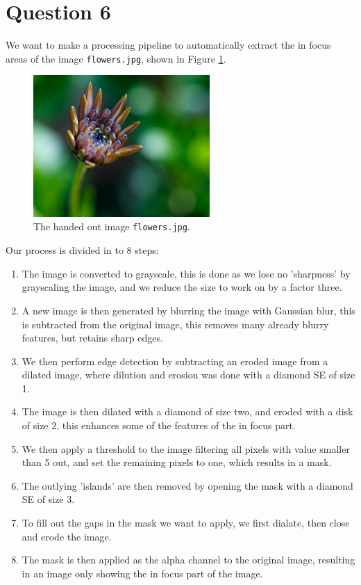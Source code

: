 \documentclass[a4paper]{article}
\begin{document}
\section*{Question 6}
We want to make a processing pipeline to automatically extract the in focus areas of the image \texttt{flowers.jpg}, shown in Figure \ref{fig:flowers}.
\begin{figure}[H]
  \centering
  \includegraphics[width=0.6\textwidth]{./src/flowers.jpg}
  \caption{The handed out image \texttt{flowers.jpg}.}
  \label{fig:flowers}
\end{figure}
Our process is divided in to 8 steps:
\begin{enumerate}
  \item The image is converted to grayscale, this is done as we lose no 'sharpness' by grayscaling the image, and we reduce the size to work on by a factor three.
  \item A new image is then generated by blurring the image with Gaussian blur, this is subtracted from the original image, this removes many already blurry features, but retains sharp edges.
  \item We then perform edge detection by subtracting an eroded image from a dilated image, where dilution and erosion was done with a diamond SE of size 1.
  \item The image is then dilated with a diamond of size two, and eroded with a disk of size 2, this enhances some of the features of the in focus part.
  \item We then apply a threshold to the image filtering all pixels with value smaller than 5 out, and set the remaining pixels to one, which results in a mask.
  \item The outlying 'islands' are then removed by opening the mask with a diamond SE of size 3.
  \item To fill out the gaps in the mask we want to apply, we first dialate, then close and erode the image.
  \item The mask is then applied as the alpha channel to the original image, resulting in an image only showing the in focus part of the image.
\end{enumerate}
\end{document}
